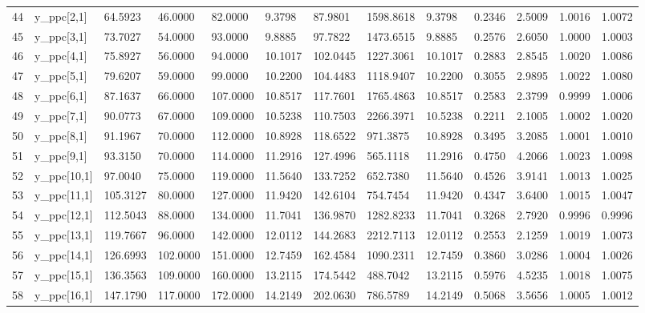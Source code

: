 \begin{table}[ht]
\begin{tabular}{rllllllllllll}
  44 & y\_ppc[2,1] &  64.5923 &   46.0000 &  82.0000 &   9.3798 &    87.9801 & 1598.8618 &   9.3798 &  0.2346 &  2.5009 & 1.0016 &  1.0072 \\ 
  45 & y\_ppc[3,1] &  73.7027 &   54.0000 &  93.0000 &   9.8885 &    97.7822 & 1473.6515 &   9.8885 &  0.2576 &  2.6050 & 1.0000 &  1.0003 \\ 
  46 & y\_ppc[4,1] &  75.8927 &   56.0000 &  94.0000 &  10.1017 &   102.0445 & 1227.3061 &  10.1017 &  0.2883 &  2.8545 & 1.0020 &  1.0086 \\ 
  47 & y\_ppc[5,1] &  79.6207 &   59.0000 &  99.0000 &  10.2200 &   104.4483 & 1118.9407 &  10.2200 &  0.3055 &  2.9895 & 1.0022 &  1.0080 \\ 
  48 & y\_ppc[6,1] &  87.1637 &   66.0000 & 107.0000 &  10.8517 &   117.7601 & 1765.4863 &  10.8517 &  0.2583 &  2.3799 & 0.9999 &  1.0006 \\ 
  49 & y\_ppc[7,1] &  90.0773 &   67.0000 & 109.0000 &  10.5238 &   110.7503 & 2266.3971 &  10.5238 &  0.2211 &  2.1005 & 1.0002 &  1.0020 \\ 
  50 & y\_ppc[8,1] &  91.1967 &   70.0000 & 112.0000 &  10.8928 &   118.6522 &  971.3875 &  10.8928 &  0.3495 &  3.2085 & 1.0001 &  1.0010 \\ 
  51 & y\_ppc[9,1] &  93.3150 &   70.0000 & 114.0000 &  11.2916 &   127.4996 &  565.1118 &  11.2916 &  0.4750 &  4.2066 & 1.0023 &  1.0098 \\ 
  52 & y\_ppc[10,1] &  97.0040 &   75.0000 & 119.0000 &  11.5640 &   133.7252 &  652.7380 &  11.5640 &  0.4526 &  3.9141 & 1.0013 &  1.0025 \\ 
  53 & y\_ppc[11,1] & 105.3127 &   80.0000 & 127.0000 &  11.9420 &   142.6104 &  754.7454 &  11.9420 &  0.4347 &  3.6400 & 1.0015 &  1.0047 \\ 
  54 & y\_ppc[12,1] & 112.5043 &   88.0000 & 134.0000 &  11.7041 &   136.9870 & 1282.8233 &  11.7041 &  0.3268 &  2.7920 & 0.9996 &  0.9996 \\ 
  55 & y\_ppc[13,1] & 119.7667 &   96.0000 & 142.0000 &  12.0112 &   144.2683 & 2212.7113 &  12.0112 &  0.2553 &  2.1259 & 1.0019 &  1.0073 \\ 
  56 & y\_ppc[14,1] & 126.6993 &  102.0000 & 151.0000 &  12.7459 &   162.4584 & 1090.2311 &  12.7459 &  0.3860 &  3.0286 & 1.0004 &  1.0026 \\ 
  57 & y\_ppc[15,1] & 136.3563 &  109.0000 & 160.0000 &  13.2115 &   174.5442 &  488.7042 &  13.2115 &  0.5976 &  4.5235 & 1.0018 &  1.0075 \\ 
  58 & y\_ppc[16,1] & 147.1790 &  117.0000 & 172.0000 &  14.2149 &   202.0630 &  786.5789 &  14.2149 &  0.5068 &  3.5656 & 1.0005 &  1.0012 \\ 

\end{tabular}
\end{table}
